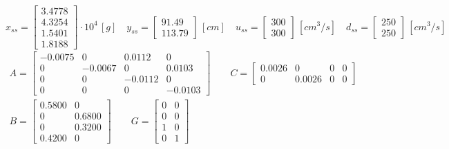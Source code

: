 \begin{equation}
    x_{ss}=\begin{bmatrix}
    3.4778 \\ 4.3254 \\ 1.5401 \\ 1.8188
    \end{bmatrix}\cdot10^4\,[g] \quad
    y_{ss}=\begin{bmatrix}
    91.49 \\ 113.79
    \end{bmatrix}\,[cm] \quad
    u_{ss}=\begin{bmatrix}
    300 \\ 300
    \end{bmatrix}\,[cm^3/s] \quad
    d_{ss}=\begin{bmatrix}
    250 \\ 250
    \end{bmatrix}\,[cm^3/s] \quad
    \label{eq:ss_values}
\end{equation}
\begin{equation}
    \begin{gathered}
        A = \begin{bmatrix}
            -0.0075 & 0 & 0.0112 & 0\\
            0 & -0.0067 & 0 & 0.0103\\
            0 & 0 & -0.0112 & 0\\
            0 & 0 & 0 & -0.0103
        \end{bmatrix} \qquad 
        C=\begin{bmatrix}
            0.0026 & 0 & 0 & 0\\
            0 & 0.0026 & 0 & 0
        \end{bmatrix} \\
        B=\begin{bmatrix}
            0.5800 & 0\\
            0 & 0.6800\\
            0 & 0.3200\\
            0.4200 & 0
        \end{bmatrix} \qquad
        G=\begin{bmatrix}
            0 & 0\\
            0 & 0\\
            1 & 0\\
            0 & 1
        \end{bmatrix} 
    \end{gathered}
    \label{eq:SS_ss}
\end{equation}
